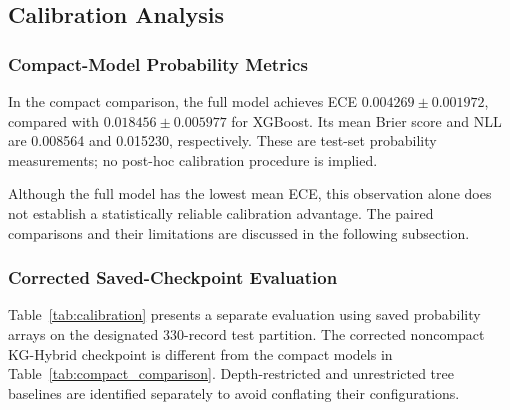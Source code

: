 \subsection{Calibration Analysis}

\subsubsection{Compact-Model Probability Metrics}

In the compact comparison, the full model achieves ECE
$0.004269\pm0.001972$, compared with
$0.018456\pm0.005977$ for XGBoost.
Its mean Brier score and NLL are 0.008564 and 0.015230,
respectively. These are test-set probability measurements; no
post-hoc calibration procedure is implied.

Although the full model has the lowest mean ECE, this observation
alone does not establish a statistically reliable calibration
advantage. The paired comparisons and their limitations are
discussed in the following subsection.

\subsubsection{Corrected Saved-Checkpoint Evaluation}

Table~\ref{tab:calibration} presents a separate evaluation using
saved probability arrays on the designated 330-record test partition.
The corrected noncompact KG-Hybrid checkpoint is different from
the compact models in Table~\ref{tab:compact_comparison}.
Depth-restricted and unrestricted tree baselines are identified
separately to avoid conflating their configurations.

